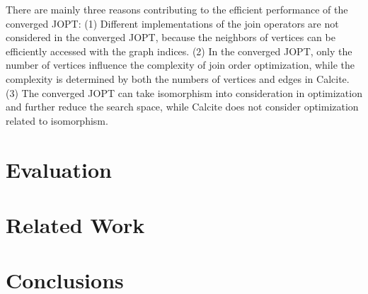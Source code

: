 \documentclass[sigconf, nonacm]{acmart}
\begin{document}
There are mainly three reasons contributing to the efficient performance of the converged JOPT:
(1) Different implementations of the join operators are not considered in the converged JOPT, because the neighbors of vertices can be efficiently accessed with the graph indices.
(2) In the converged JOPT, only the number of vertices influence the complexity of join order optimization, while the complexity is determined by both the numbers of vertices and edges in Calcite.
(3) The converged JOPT can take isomorphism into consideration in optimization and further reduce the search space, while Calcite does not consider optimization related to isomorphism.


\section{Evaluation}


\section{Related Work}


\section{Conclusions}
\label{sec:conclusions}






\end{document}
